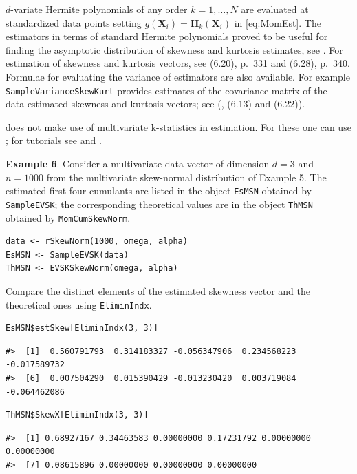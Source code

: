 \(d\)-variate Hermite polynomials of any order \(k=1, \dots, N\) are evaluated at standardized data points setting \(g(\mathbf{X}_i)=\mathbf{H}_k(\mathbf{X}_i)\) in \eqref{eq:MomEst}. The estimators in terms of standard Hermite polynomials proved to be useful for finding the asymptotic distribution of skewness and kurtosis estimates, see \citet{jamma2021SJS}. For estimation of skewness and kurtosis vectors, see \citet{terdik2021multivariate} (6.20), p.~331 and (6.28), p.~340. Formulae for evaluating the variance of estimators are also available. For example \texttt{SampleVarianceSkewKurt} provides estimates of the covariance matrix of the data-estimated skewness and kurtosis vectors; see (\citet{terdik2021multivariate}, (6.13) and (6.22)).

 does not make use of multivariate k-statistics in estimation. For these one can use ; for tutorials see \citet{dinardo22b} and \citet{smith2020tutorial}.

\textbf{Example 6}. Consider a multivariate data vector of dimension \(d=3\) and \(n=1000\) from the multivariate skew-normal distribution of Example 5. The estimated first four cumulants are listed in the object \texttt{EsMSN} obtained by \texttt{SampleEVSK}; the corresponding theoretical values are in the object \texttt{ThMSN} obtained by \texttt{MomCumSkewNorm}.

\begin{verbatim}
data <- rSkewNorm(1000, omega, alpha)
EsMSN <- SampleEVSK(data)
ThMSN <- EVSKSkewNorm(omega, alpha)
\end{verbatim}

Compare the distinct elements of the estimated skewness vector and the theoretical ones using \texttt{EliminIndx}.

\begin{verbatim}
EsMSN$estSkew[EliminIndx(3, 3)]
\end{verbatim}

\begin{verbatim}
#>  [1]  0.560791793  0.314183327 -0.056347906  0.234568223 -0.017589732
#>  [6]  0.007504290  0.015390429 -0.013230420  0.003719084 -0.064462086
\end{verbatim}

\begin{verbatim}
ThMSN$SkewX[EliminIndx(3, 3)]
\end{verbatim}

\begin{verbatim}
#>  [1] 0.68927167 0.34463583 0.00000000 0.17231792 0.00000000 0.00000000
#>  [7] 0.08615896 0.00000000 0.00000000 0.00000000
\end{verbatim}

